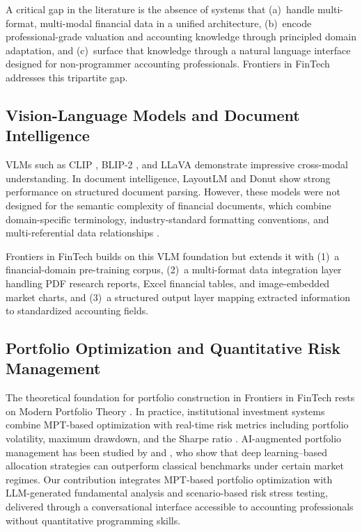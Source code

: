 \documentclass[12pt,letterpaper]{article}
\begin{document}
A critical gap in the literature is the absence of systems that
(a)~handle multi-format, multi-modal financial data in a unified
architecture, (b)~encode professional-grade valuation and accounting
knowledge through principled domain adaptation, and
(c)~surface that knowledge through a natural language interface
designed for non-programmer accounting professionals.
Frontiers in FinTech addresses this tripartite gap.

\subsection{Vision-Language Models and Document Intelligence}

VLMs such as CLIP \citep{radford2021}, BLIP-2 \citep{li2023}, and
LLaVA \citep{liu2024} demonstrate impressive cross-modal understanding.
In document intelligence, LayoutLM \citep{xu2020} and Donut \citep{kim2022}
show strong performance on structured document parsing.
However, these models were not designed for the semantic complexity of
financial documents, which combine domain-specific terminology,
industry-standard formatting conventions, and multi-referential data
relationships \citep{zhang2022}.

Frontiers in FinTech builds on this VLM foundation but extends it with
(1)~a financial-domain pre-training corpus,
(2)~a multi-format data integration layer handling PDF research reports,
Excel financial tables, and image-embedded market charts, and
(3)~a structured output layer mapping extracted information to
standardized accounting fields.

\subsection{Portfolio Optimization and Quantitative Risk Management}

The theoretical foundation for portfolio construction in Frontiers in FinTech rests
on Modern Portfolio Theory \citep{markowitz1952}.
In practice, institutional investment systems combine MPT-based
optimization with real-time risk metrics including portfolio volatility,
maximum drawdown, and the Sharpe ratio \citep{sharpe1994}.
AI-augmented portfolio management has been studied by \citet{jiang2017}
and \citet{zhang2020}, who show that deep learning--based allocation
strategies can outperform classical benchmarks under certain market
regimes.
Our contribution integrates MPT-based portfolio optimization with
LLM-generated fundamental analysis and scenario-based risk stress
testing, delivered through a conversational interface accessible to
accounting professionals without quantitative programming skills.
\end{document}
